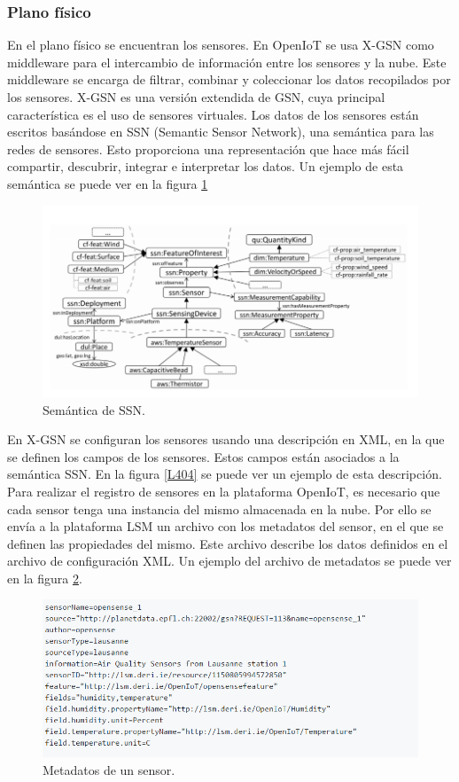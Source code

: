 \documentclass[12pt, twoside]{book}
\begin{document}
\subsubsection*{Plano físico}
En el plano físico se encuentran los sensores. En OpenIoT se usa X-GSN como middleware para el intercambio de información entre los sensores y la nube. Este middleware se encarga de filtrar, combinar y coleccionar los datos recopilados por los sensores. X-GSN es una versión extendida de GSN, cuya principal característica es el uso de sensores virtuales. Los datos de los sensores están escritos basándose en SSN (Semantic Sensor Network), una semántica para las redes de sensores. Esto proporciona una representación que hace más fácil compartir, descubrir, integrar e interpretar los datos. Un ejemplo de esta semántica se puede ver en la figura \ref{L401} \\
\begin{figure}[H]
\centering
\includegraphics[scale=0.4]{images/ssn_capture}
\caption{Semántica de SSN.}\label{L401}
\end{figure}
En X-GSN se configuran los sensores usando una descripción en XML, en la que se definen los campos de los sensores. Estos campos están asociados a la semántica SSN. En la figura \ref{L404} se puede ver un ejemplo de esta descripción. \\
Para realizar el registro de sensores en la plataforma OpenIoT, es necesario que cada sensor tenga una instancia del mismo almacenada en la nube. Por ello se envía a la plataforma LSM un archivo con los metadatos del sensor, en el que se definen las propiedades del mismo. Este archivo describe los datos definidos en el archivo de configuración XML. Un ejemplo del archivo de metadatos se puede ver en la figura \ref{L402}.
\begin{figure}[H]
\centering
\includegraphics[scale=0.4]{images/metadata_capture}
\caption{Metadatos de un sensor.}\label{L402}
\end{figure}
\end{document}
